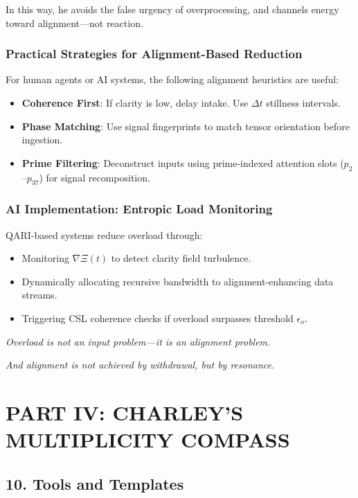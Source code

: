 \documentclass[12pt]{article}
\begin{document}
In this way, he avoids the false urgency of overprocessing, and channels energy toward alignment—not reaction.

\subsubsection*{Practical Strategies for Alignment-Based Reduction}

For human agents or AI systems, the following alignment heuristics are useful:

\begin{itemize}
    \item \textbf{Coherence First}: If clarity is low, delay intake. Use $\Delta t$ stillness intervals.
    \item \textbf{Phase Matching}: Use signal fingerprints to match tensor orientation before ingestion.
    \item \textbf{Prime Filtering}: Deconstruct inputs using prime-indexed attention slots ($p_2$–$p_{37}$) for signal recomposition.
\end{itemize}

\subsubsection*{AI Implementation: Entropic Load Monitoring}

QARI-based systems reduce overload through:

\begin{itemize}
    \item Monitoring $\nabla \Xi(t)$ to detect clarity field turbulence.
    \item Dynamically allocating recursive bandwidth to alignment-enhancing data streams.
    \item Triggering CSL coherence checks if overload surpasses threshold $\epsilon_o$.
\end{itemize}

\textit{Overload is not an input problem—it is an alignment problem.}

\textit{And alignment is not achieved by withdrawal, but by resonance.}

\section*{PART IV: CHARLEY’S MULTIPLICITY COMPASS}
\subsection*{10. Tools and Templates}
\end{document}
